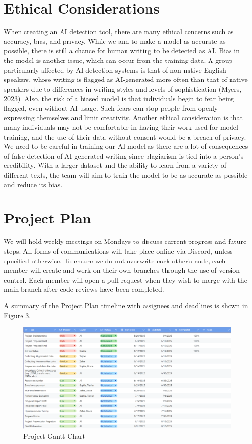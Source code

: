 \documentclass{article} %
\begin{document}
\section{Ethical Considerations}
When creating an AI detection tool, there are many ethical concerns such as accuracy, bias, and privacy.
While we aim to make a model as accurate as possible, there is still a chance for human writing to be detected as AI. Bias in the model is another issue, which can occur from the training data. A group particularly affected by AI detection systems is that of non-native English speakers, whose writing is flagged as AI-generated more often than that of native speakers due to differences in writing styles and levels of sophistication (Myers, 2023). Also, the risk of a biased model is that individuals begin to fear being flagged, even without AI usage. Such fears can stop people from openly expressing themselves and limit creativity. Another ethical consideration is that many individuals may not be comfortable in having their work used for model training, and the use of their data without consent would be a breach of privacy. 
We need to be careful in training our AI model as there are a lot of consequences of false detection of AI generated writing since plagiarism is tied into a person’s credibility. With a larger dataset and the ability to learn from a variety of different texts, the team will aim to train the model to be as accurate as possible and reduce its bias.

\section{Project Plan}
We will hold weekly meetings on Mondays to discuss current progress and future steps. All forms of communications will take place online via Discord, unless specified otherwise. To ensure we do not overwrite each other's code, each member will create and work on their own branches through the use of version control. Each member will open a pull request when they wish to merge with the main branch after code reviews have been completed. 

A summary of the Project Plan timeline with assignees and deadlines is shown in Figure 3. 
\begin{figure}[htbp]
    \centering
    \includegraphics[width=0.9\linewidth,height=0.9\textheight,keepaspectratio]{gnatt.png}
    \caption{Project Gantt Chart}
    \label{fig:pipeline}
\end{figure}
\end{document}
